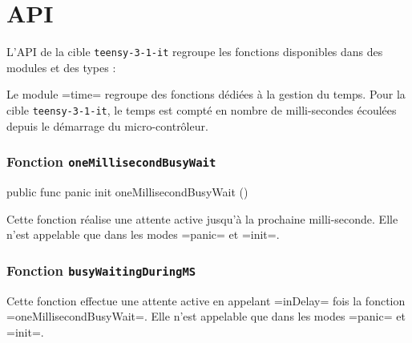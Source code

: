 \section{API}

L'API de la cible \texttt{teensy-3-1-it} regroupe les fonctions disponibles dans des modules et des types :


Le module \plm=time= regroupe des fonctions dédiées à la gestion du temps. Pour la cible \texttt{teensy-3-1-it}, le temps est compté en nombre de milli-secondes écoulées depuis le démarrage du micro-contrôleur. 

\subsubsection{Fonction \texttt{oneMillisecondBusyWait}}


\begin{PLM}
  public func panic init oneMillisecondBusyWait ()
\end{PLM}

Cette fonction réalise une attente active jusqu'à la prochaine milli-seconde. Elle n'est appelable que dans les modes \plm=panic= et \plm=init=. 





\subsubsection{Fonction \texttt{busyWaitingDuringMS}}


Cette fonction effectue une attente active en appelant \plm=inDelay= fois la fonction \plm=oneMillisecondBusyWait=. Elle n'est appelable que dans les modes \plm=panic= et \plm=init=. 





